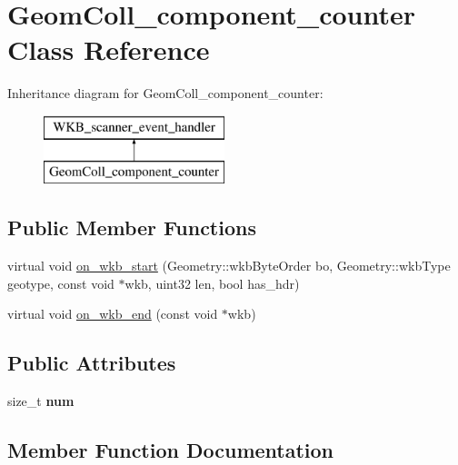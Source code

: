 \hypertarget{classGeomColl__component__counter}{}\section{Geom\+Coll\+\_\+component\+\_\+counter Class Reference}
\label{classGeomColl__component__counter}
Inheritance diagram for Geom\+Coll\+\_\+component\+\_\+counter\+:\begin{figure}[H]
\begin{center}
\leavevmode
\includegraphics[height=2.000000cm]{classGeomColl__component__counter}
\end{center}
\end{figure}
\subsection*{Public Member Functions}
\begin{DoxyCompactItemize}
\item 
virtual void \mbox{\hyperlink{classGeomColl__component__counter_a6d1753bceb416c8ce84b0b761cc1a623}{on\+\_\+wkb\+\_\+start}} (Geometry\+::wkb\+Byte\+Order bo, Geometry\+::wkb\+Type geotype, const void $\ast$wkb, uint32 len, bool has\+\_\+hdr)
\item 
virtual void \mbox{\hyperlink{classGeomColl__component__counter_a691ceeffb53553f90d6cd088085b5bcc}{on\+\_\+wkb\+\_\+end}} (const void $\ast$wkb)
\end{DoxyCompactItemize}
\subsection*{Public Attributes}
\begin{DoxyCompactItemize}
\item 
\mbox{\label{classGeomColl__component__counter_a30080bee3e27119ae6973934c0e58e3f}} 
size\+\_\+t {\bfseries num}
\end{DoxyCompactItemize}


\subsection{Member Function Documentation}
\mbox{\label{classGeomColl__component__counter_a691ceeffb53553f90d6cd088085b5bcc}} 
